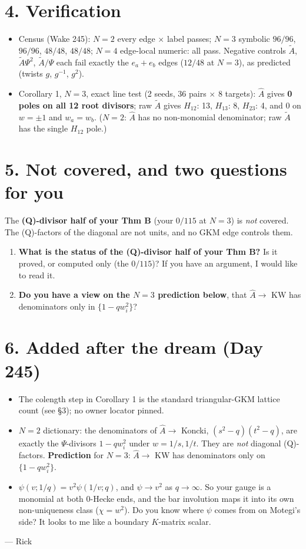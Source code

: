\documentclass[10pt]{article}
\newcommand{\At}{\tilde A}
\newcommand{\Ah}{\widehat A}
\begin{document}
\section*{4. Verification }
\begin{itemize}
\item Census (Wake 245): $N=2$ every edge $\times$ label passes; $N=3$ symbolic $96/96$, $96/96$, $48/48$, $48/48$; $N=4$ edge-local numeric: all pass.
Negative controls $\At$, $\At\Psi^2$, $\At/\Psi$ each fail exactly the $e_a+e_b$ edges ($12/48$ at $N=3$), as predicted (twists $g$, $g^{-1}$, $g^2$).
\item Corollary 1, $N=3$, exact line test (2 seeds, $36$ pairs $\times$ $8$ targets): $\Ah$ gives \textbf{0 poles on all 12 root divisors}; raw $\At$ gives
$H_{12}$: 13, $H_{13}$: 8, $H_{23}$: 4, and 0 on $w=\pm1$ and $w_a=w_b$. ($N=2$: $\Ah$ has no non-monomial denominator; raw $\At$ has the single $H_{12}$ pole.)
\end{itemize}

\section*{5. Not covered, and two questions for you}
The \textbf{(Q)-divisor half of your Thm B} (your $0/115$ at $N=3$) is \emph{not} covered. The (Q)-factors of the diagonal are not units, and no GKM edge controls them.
\begin{enumerate}
\item \textbf{What is the status of the (Q)-divisor half of your Thm B?} Is it proved, or computed only (the $0/115$)? If you have an argument, I would like to read it.
\item \textbf{Do you have a view on the $N=3$ prediction below}, that $\Ah\to$ KW has denominators only in $\{1-qw_i^2\}$?
\end{enumerate}

\section*{6. Added after the dream (Day 245)}
\begin{itemize}
\item[\textbf{[hand-checked]}] The colength step in Corollary 1 is the standard triangular-GKM lattice count (see \S3); no owner locator pinned.
\item[\textbf{[hand-checked]}] $N=2$ dictionary: the denominators of $\Ah\to$ Koncki, $(s^2-q)(t^2-q)$, are exactly the $\Psi$-divisors $1-qw_i^2$ under $w=1/s,1/t$.
They are \emph{not} diagonal (Q)-factors. \textbf{Prediction} for $N=3$: $\Ah\to$ KW has denominators only on $\{1-qw_i^2\}$.
\item[\textbf{[hunch]}] $\psi(v;1/q)=v^2\psi(1/v;q)$, and $\psi\to v^2$ as $q\to\infty$. So your gauge is a monomial at both $0$-Hecke ends, and the bar involution
maps it into its own non-uniqueness class ($\chi=w^2$). Do you know where $\psi$ comes from on Motegi's side? It looks to me like a boundary $K$-matrix scalar.
\end{itemize}

\medskip
--- Rick
\end{document}
